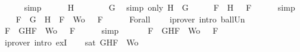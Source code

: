 \begin{isabellebody}
\ \ \ \ \isamarkupfalse%
\ simp\isanewline
\ \ \isamarkupfalse%
\ {\isachardoublequoteopen}{\isasymA}\ {\isasymTurnstile}\ H{\isachardoublequoteclose}\isanewline
\ \ \ \ \isamarkupfalse%
\ {\isacartoucheopen}{\isasymA}\ {\isasymTurnstile}\ G{\isacartoucheclose}\ \isamarkupfalse%
\ {\isacharparenleft}simp\ only{\isacharcolon}\ {\isacartoucheopen}H\ {\isacharequal}\ G{\isacartoucheclose}{\isacharparenright}\isanewline
\ \ \isamarkupfalse%
\ \isamarkupfalse%
\ {}{\isacharcolon}{\isachardoublequoteopen}{\isasymforall}F\ {\isasymin}\ {\isacharbraceleft}H{\isacharbraceright}{\isachardot}\ {\isasymA}\ {\isasymTurnstile}\ F{\isachardoublequoteclose}\isanewline
\ \ \ \ \isamarkupfalse%
\ simp\isanewline
\ \ \isamarkupfalse%
\ {\isachardoublequoteopen}{\isasymforall}F\ {\isasymin}\ {\isacharparenleft}{\isacharbraceleft}G{\isacharbraceright}\ {\isasymunion}\ {\isacharbraceleft}H{\isacharbraceright}{\isacharparenright}\ {\isasymunion}\ {\isacharparenleft}{\isacharbraceleft}F{\isacharbraceright}\ {\isasymunion}\ Wo{\isacharparenright}{\isachardot}\ {\isasymA}\ {\isasymTurnstile}\ F{\isachardoublequoteclose}\isanewline
\ \ \ \ \isamarkupfalse%
\ Forall{}\ {}\ {}\ \isamarkupfalse%
\ {\isacharparenleft}iprover\ intro{\isacharcolon}\ ball{\isacharunderscore}Un{\isacharparenright}\isanewline
\ \ \isamarkupfalse%
\ \isamarkupfalse%
\ {\isachardoublequoteopen}{\isasymforall}F\ {\isasymin}\ {\isacharbraceleft}G{\isacharcomma}H{\isacharcomma}F{\isacharbraceright}\ {\isasymunion}\ Wo{\isachardot}\ {\isasymA}\ {\isasymTurnstile}\ F{\isachardoublequoteclose}\isanewline
\ \ \ \ \isamarkupfalse%
\ simp\isanewline
\ \ \isamarkupfalse%
\ \isamarkupfalse%
\ {\isachardoublequoteopen}{\isasymexists}{\isasymA}{\isachardot}\ {\isasymforall}F\ {\isasymin}\ {\isacharparenleft}{\isacharbraceleft}G{\isacharcomma}H{\isacharcomma}F{\isacharbraceright}\ {\isasymunion}\ Wo{\isacharparenright}{\isachardot}\ {\isasymA}\ {\isasymTurnstile}\ F{\isachardoublequoteclose}\isanewline
\ \ \ \ \isamarkupfalse%
\ {\isacharparenleft}iprover\ intro{\isacharcolon}\ exI{\isacharparenright}\isanewline
\ \ \isamarkupfalse%
\ {\isachardoublequoteopen}sat\ {\isacharparenleft}{\isacharbraceleft}G{\isacharcomma}H{\isacharcomma}F{\isacharbraceright}\ {\isasymunion}\ Wo{\isacharparenright}{\isachardoublequoteclose}\isanewline

\end{isabellebody}

